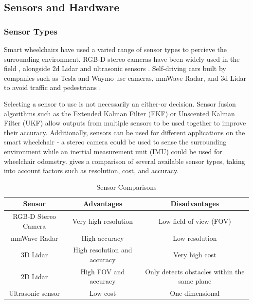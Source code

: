 \documentclass[12pt]{article}
\begin{document}
\subsection{Sensors and Hardware}

\subsubsection{Sensor Types}
Smart wheelchairs have used a varied range of sensor types to percieve the surrounding environment.
RGB-D stereo cameras have been widely used in the field \cite{wangS2P2SelfSupervisedGoalDirected2021}\cite{wangSelfSupervisedDrivableArea2019}\cite{jainAutomatedPerceptionSafe2014},
alongside 2d Lidar \cite{scudellariSelfdrivingWheelchairsDebut2017} and ultrasonic sensors \cite{levineNavChairAssistiveWheelchair1999}.
Self-driving cars built by companies such as Tesla and Waymo
use cameras, mmWave Radar, and 3d Lidar to avoid traffic and pedestrians \cite{karpathyTeslaAIDay2021}.

Selecting a sensor to use is not necessarily an either-or decision. Sensor fusion algorithms such as
the Extended Kalman Filter (EKF) or Unscented Kalman Filter (UKF) \cite{wanUnscentedKalmanFilter2000} allow
outputs from multiple sensors to be used together to improve their accuracy. Additionally, sensors can
be used for different applications on the smart wheelchair - a stereo camera could be used to sense the surrounding environment
while an inertial measurement unit (IMU) could be used for wheelchair odometry.
 gives a comparison of several available sensor types,
taking into account factors such as resolution, cost, and accuracy.

\begin{table}[H]
    \centering
\begin{adjustbox}{width=\textwidth}
    \begin{tabular}{c c c}
    \toprule
    Sensor & Advantages & Disadvantages \\
    \midrule
    RGB-D Stereo Camera & Very high resolution & Low field of view (FOV) \\
    mmWave Radar & High accuracy & Low resolution \\
    3D Lidar & High resolution and accuracy & Very high cost \\
    2D Lidar & High FOV and accuracy & Only detects obstacles within the same plane \\
    Ultrasonic sensor & Low cost & One-dimensional \\
    \bottomrule
    \end{tabular}
\end{adjustbox}
    \caption{Sensor Comparisons}
    \label{table:sensor_options}
\end{table}
\end{document}
